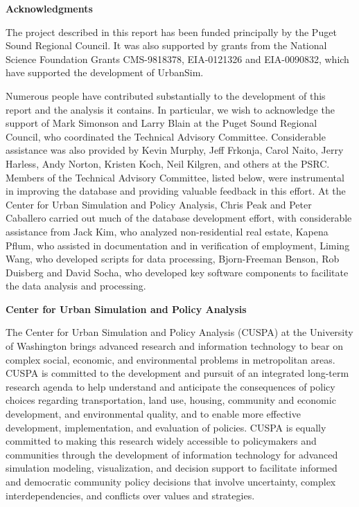 
{\bf \large Acknowledgments}

The project described in this report has been funded principally
by the Puget Sound Regional Council. It was also supported by
grants from the National Science Foundation Grants CMS-9818378,
EIA-0121326 and EIA-0090832, which have supported the development
of UrbanSim.

Numerous people have contributed substantially to the development
of this report and the analysis it contains.  In particular, we
wish to acknowledge the support of Mark Simonson and Larry Blain
at the Puget Sound Regional Council, who coordinated the Technical
Advisory Committee. Considerable assistance was also provided by
Kevin Murphy, Jeff Frkonja, Carol Naito, Jerry Harless, Andy
Norton, Kristen Koch, Neil Kilgren, and others at the PSRC.
Members of the Technical Advisory Committee, listed below, were
instrumental in improving the database and providing valuable
feedback in this effort.  At the Center for Urban Simulation and
Policy Analysis, Chris Peak and Peter Caballero carried out much
of the database development effort, with considerable assistance
from Jack Kim, who analyzed non-residential real estate, Kapena
Pflum, who assisted in documentation and in verification of
employment, Liming Wang, who developed scripts for data
processing, Bjorn-Freeman Benson, Rob Duisberg and David Socha,
who developed key software components to facilitate the data
analysis and processing.

{\bf \large Center for Urban Simulation and Policy Analysis}

The Center for Urban Simulation and Policy Analysis (CUSPA) at the
University of Washington brings advanced research and information
technology to bear on complex social, economic, and environmental
problems in metropolitan areas.  CUSPA is committed to the
development and pursuit of an integrated long-term research agenda
to help understand and anticipate the consequences of policy
choices regarding transportation, land use, housing, community and
economic development, and environmental quality, and to enable
more effective development, implementation, and evaluation of
policies. CUSPA is equally committed to making this research
widely accessible to policymakers and communities through the
development of information technology for advanced simulation
modeling, visualization, and decision support to facilitate
informed and democratic community policy decisions that involve
uncertainty, complex interdependencies, and conflicts over values
and strategies.

